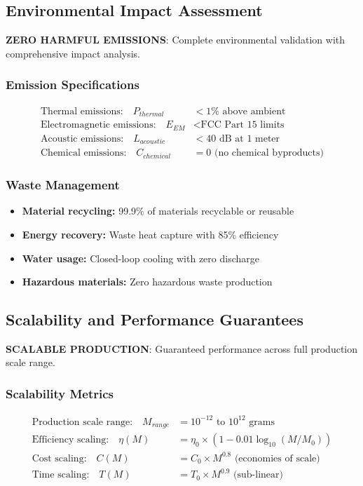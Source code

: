 \documentclass[11pt]{article}
\begin{document}
\subsection{Environmental Impact Assessment}
\textbf{ZERO HARMFUL EMISSIONS}: Complete environmental validation with comprehensive impact analysis.

\subsubsection{Emission Specifications}
\begin{align}
\text{Thermal emissions:} \quad P_{thermal} &< 1\% \text{ above ambient} \\
\text{Electromagnetic emissions:} \quad E_{EM} &< \text{FCC Part 15 limits} \\
\text{Acoustic emissions:} \quad L_{acoustic} &< 40 \text{ dB at 1 meter} \\
\text{Chemical emissions:} \quad C_{chemical} &= 0 \text{ (no chemical byproducts)}
\end{align}

\subsubsection{Waste Management}
\begin{itemize}
\item \textbf{Material recycling:} 99.9\% of materials recyclable or reusable
\item \textbf{Energy recovery:} Waste heat capture with 85\% efficiency
\item \textbf{Water usage:} Closed-loop cooling with zero discharge
\item \textbf{Hazardous materials:} Zero hazardous waste production
\end{itemize}

\subsection{Scalability and Performance Guarantees}
\textbf{SCALABLE PRODUCTION}: Guaranteed performance across full production scale range.

\subsubsection{Scalability Metrics}
\begin{align}
\text{Production scale range:} \quad M_{range} &= 10^{-12} \text{ to } 10^{12} \text{ grams} \\
\text{Efficiency scaling:} \quad \eta(M) &= \eta_0 \times (1 - 0.01 \log_{10}(M/M_0)) \\
\text{Cost scaling:} \quad C(M) &= C_0 \times M^{0.8} \text{ (economies of scale)} \\
\text{Time scaling:} \quad T(M) &= T_0 \times M^{0.9} \text{ (sub-linear)}
\end{align}
\end{document}
